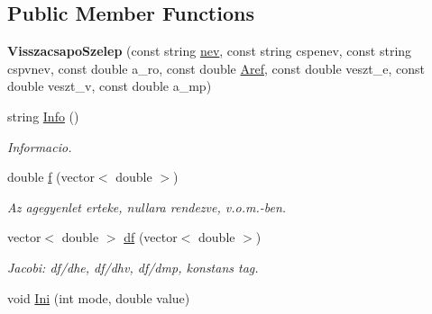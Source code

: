 \subsection*{Public Member Functions}
\begin{DoxyCompactItemize}
\item 
{\bfseries Visszacsapo\+Szelep} (const string \hyperlink{class_agelem_abe92b7e3912367d5d1caf6b277ca0b7d}{nev}, const string cspenev, const string cspvnev, const double a\+\_\+ro, const double \hyperlink{class_agelem_a3f8668febc2958fd539997d537552f17}{Aref}, const double veszt\+\_\+e, const double veszt\+\_\+v, const double a\+\_\+mp)\hypertarget{class_visszacsapo_szelep_a40da5edbf8243f70eedb5891a0cd6b19}{}\label{class_visszacsapo_szelep_a40da5edbf8243f70eedb5891a0cd6b19}

\item 
string \hyperlink{class_visszacsapo_szelep_ae4304110869247cb1d1428c366553665}{Info} ()\hypertarget{class_visszacsapo_szelep_ae4304110869247cb1d1428c366553665}{}\label{class_visszacsapo_szelep_ae4304110869247cb1d1428c366553665}

\begin{DoxyCompactList}\small\item\em Informacio. \end{DoxyCompactList}\item 
double \hyperlink{class_visszacsapo_szelep_aa148976fb3ca2ab3d35c255dcc83c947}{f} (vector$<$ double $>$)\hypertarget{class_visszacsapo_szelep_aa148976fb3ca2ab3d35c255dcc83c947}{}\label{class_visszacsapo_szelep_aa148976fb3ca2ab3d35c255dcc83c947}

\begin{DoxyCompactList}\small\item\em Az agegyenlet erteke, nullara rendezve, v.\+o.\+m.-\/ben. \end{DoxyCompactList}\item 
vector$<$ double $>$ \hyperlink{class_visszacsapo_szelep_a9925c2e8f958d4d5707dd563f9d3ff31}{df} (vector$<$ double $>$)\hypertarget{class_visszacsapo_szelep_a9925c2e8f958d4d5707dd563f9d3ff31}{}\label{class_visszacsapo_szelep_a9925c2e8f958d4d5707dd563f9d3ff31}

\begin{DoxyCompactList}\small\item\em Jacobi\+: df/dhe, df/dhv, df/dmp, konstans tag. \end{DoxyCompactList}\item 
void \hyperlink{class_visszacsapo_szelep_a3473fbea667f172b09beae228c730e4f}{Ini} (int mode, double value)\hypertarget{class_visszacsapo_szelep_a3473fbea667f172b09beae228c730e4f}{}\label{class_visszacsapo_szelep_a3473fbea667f172b09beae228c730e4f}


\end{DoxyCompactItemize}
